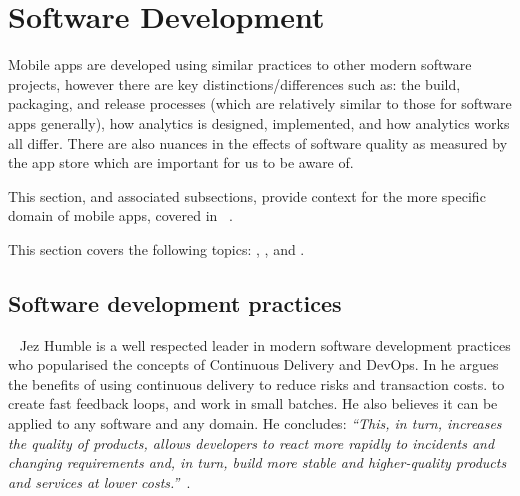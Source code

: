 \section{Software Development}

Mobile apps are developed using similar practices to other modern software projects, however there are key distinctions/differences such as: the build, packaging, and release processes (which are relatively similar to those for software apps generally), how analytics is designed, implemented, and how analytics works all differ. There are also nuances in the effects of software quality as measured by the app store which are important for us to be aware of.

This section, and associated subsections, provide context for the more specific domain of mobile apps, covered in ~.
 
This section covers the following topics: , , and .

\subsection{Software development practices}~\label{rw-software-development-practices-topic}
Jez Humble is a well respected leader in modern software development practices who popularised the concepts of Continuous Delivery and DevOps. In  he argues the benefits of using continuous delivery to reduce risks and transaction costs. to create fast feedback loops, and work in small batches. He also believes it can be applied to any software and any domain. He concludes: \emph{``This, in turn, increases the quality of products, allows developers to react more rapidly to incidents and changing requirements and, in turn, build more stable and higher-quality products and services at lower costs.''}~. 

